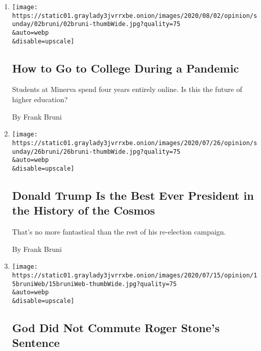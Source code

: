 \begin{enumerate}
\def\labelenumi{\arabic{enumi}.}
\item
  \href{/2020/08/01/opinion/sunday/minerva-college-coronavirus.html}{}

  \texttt{[image: https://static01.graylady3jvrrxbe.onion/images/2020/08/02/opinion/sunday/02bruni/02bruni-thumbWide.jpg?quality=75\\\&auto=webp\\\&disable=upscale]}

  \hypertarget{how-to-go-to-college-during-a-pandemic}{%
  \subsection{How to Go to College During a
  Pandemic}\label{how-to-go-to-college-during-a-pandemic}}

  Students at Minerva spend four years entirely online. Is this the
  future of higher education?

  By Frank Bruni
\item
  \href{/2020/07/25/opinion/sunday/trump-lies.html}{}

  \texttt{[image: https://static01.graylady3jvrrxbe.onion/images/2020/07/26/opinion/sunday/26bruni/26bruni-thumbWide.jpg?quality=75\\\&auto=webp\\\&disable=upscale]}

  \hypertarget{donald-trump-is-the-best-ever-president-in-the-history-of-the-cosmos}{%
  \subsection{Donald Trump Is the Best Ever President in the History of
  the
  Cosmos}\label{donald-trump-is-the-best-ever-president-in-the-history-of-the-cosmos}}

  That's no more fantastical than the rest of his re-election campaign.

  By Frank Bruni
\item
  \href{/2020/07/15/opinion/roger-stone-trump-god.html}{}

  \texttt{[image: https://static01.graylady3jvrrxbe.onion/images/2020/07/15/opinion/15bruniWeb/15bruniWeb-thumbWide.jpg?quality=75\\\&auto=webp\\\&disable=upscale]}

  \hypertarget{god-did-not-commute-roger-stones-sentence}{%
  \subsection{God Did Not Commute Roger Stone's
  Sentence}\label{god-did-not-commute-roger-stones-sentence}}


\end{enumerate}
